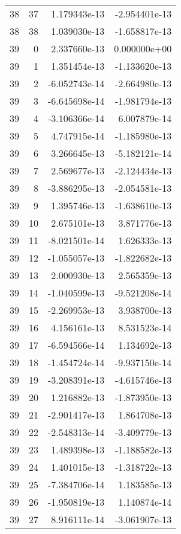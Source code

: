 \begin{tabular}{rrrr}
  38 &   37 &  1.179343e-13 & -2.954401e-13 \\
  38 &   38 &  1.039030e-13 & -1.658817e-13 \\
  39 &    0 &  2.337660e-13 &  0.000000e+00 \\
  39 &    1 &  1.351454e-13 & -1.133620e-13 \\
  39 &    2 & -6.052743e-14 & -2.664980e-13 \\
  39 &    3 & -6.645698e-14 & -1.981794e-13 \\
  39 &    4 & -3.106366e-14 &  6.007879e-14 \\
  39 &    5 &  4.747915e-14 & -1.185980e-13 \\
  39 &    6 &  3.266645e-13 & -5.182121e-14 \\
  39 &    7 &  2.569677e-13 & -2.124434e-13 \\
  39 &    8 & -3.886295e-13 & -2.054581e-13 \\
  39 &    9 &  1.395746e-13 & -1.638610e-13 \\
  39 &   10 &  2.675101e-13 &  3.871776e-13 \\
  39 &   11 & -8.021501e-14 &  1.626333e-13 \\
  39 &   12 & -1.055057e-13 & -1.822682e-13 \\
  39 &   13 &  2.000930e-13 &  2.565359e-13 \\
  39 &   14 & -1.040599e-13 & -9.521208e-14 \\
  39 &   15 & -2.269953e-13 &  3.938700e-13 \\
  39 &   16 &  4.156161e-13 &  8.531523e-14 \\
  39 &   17 & -6.594566e-14 &  1.134692e-13 \\
  39 &   18 & -1.454724e-14 & -9.937150e-14 \\
  39 &   19 & -3.208391e-13 & -4.615746e-13 \\
  39 &   20 &  1.216882e-13 & -1.873950e-13 \\
  39 &   21 & -2.901417e-13 &  1.864708e-13 \\
  39 &   22 & -2.548313e-14 & -3.409779e-13 \\
  39 &   23 &  1.489398e-13 & -1.188582e-13 \\
  39 &   24 &  1.401015e-13 & -1.318722e-13 \\
  39 &   25 & -7.384706e-14 &  1.183585e-13 \\
  39 &   26 & -1.950819e-13 &  1.140874e-14 \\
  39 &   27 &  8.916111e-14 & -3.061907e-13 \\

\end{tabular}
